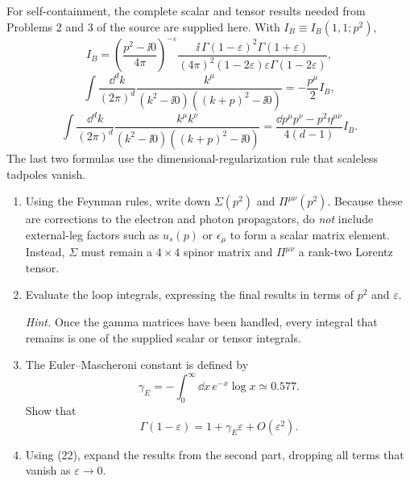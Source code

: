 \begin{enumerate}
For self-containment, the complete scalar and tensor results needed from
Problems 2 and 3 of the source are supplied here.  With
\(I_B\equiv I_B(1,1;p^2)\),
\[
 I_B=\left(\frac{p^2-\ii0}{4\pi}\right)^{-\varepsilon}
 \frac{\ii\,\Gamma(1-\varepsilon)^2\Gamma(1+\varepsilon)}
 {(4\pi)^2(1-2\varepsilon)\varepsilon
 \Gamma(1-2\varepsilon)},
\]
\[
 \int\frac{\dd^dk}{(2\pi)^d}
 \frac{k^\mu}{(k^2-\ii0)((k+p)^2-\ii0)}
 =-\frac{p^\mu}{2}I_B,
\]
\[
 \int\frac{\dd^dk}{(2\pi)^d}
 \frac{k^\mu k^\nu}{(k^2-\ii0)((k+p)^2-\ii0)}
 =\frac{\dd p^\mu p^\nu-p^2\eta^{\mu\nu}}
 {4(d-1)}I_B.
\]
The last two formulas use the dimensional-regularization rule that
scaleless tadpoles vanish.
\begin{enumerate}
\item
Using the Feynman rules, write down \(\Sigma(p^2)\) and
\(\Pi^{\mu\nu}(p^2)\).  Because these are corrections to the electron and
photon propagators, do \emph{not} include external-leg factors such as
\(u_s(p)\) or \(\epsilon_\mu\) to form a scalar matrix element.  Instead,
\(\Sigma\) must remain a \(4\times4\) spinor matrix and \(\Pi^{\mu\nu}\) a
rank-two Lorentz tensor.

\item
Evaluate the loop integrals, expressing the final results in terms of
\(p^2\) and \(\varepsilon\).

\emph{Hint.} Once the gamma matrices have been handled, every integral that
remains is one of the supplied scalar or tensor integrals.

\item
The Euler--Mascheroni constant is defined by
\[
 \gamma_E=-\int_0^\infty \dd x\,e^{-x}\log x\simeq0.577.
 \tag{21}
\]
Show that
\[
 \Gamma(1-\varepsilon)=1+\gamma_E\varepsilon
 +O(\varepsilon^2).
 \tag{22}
\]

\item
Using (22), expand the results from the second part, dropping all terms that
vanish as \(\varepsilon\to0\).
\end{enumerate}


\end{enumerate}
